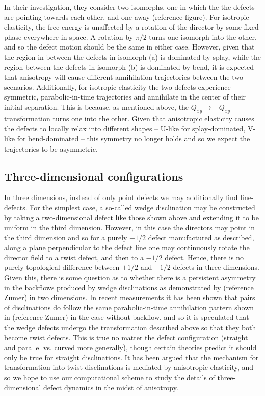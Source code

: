 \documentclass[reqno]{article}
\begin{document}
  In their investigation, they consider two isomorphs, one in which the the
  defects are pointing towards each other, and one away (reference figure).
  For isotropic elasticity, the free energy is unaffected by a rotation of the
  director by some fixed phase everywhere in space.
  A rotation by $\pi / 2$ turns one isomorph into the other, and so the defect
  motion should be the same in either case.
  However, given that the region in between the defects in isomorph (a) is dominated by splay,
  while the region between the defects in isomorph (b) is dominated by bend, it
  is expected that anisotropy will cause different annihilation trajectories
  between the two scenarios.
  Additionally, for isotropic elasticity the two defects experience symmetric,
  parabolic-in-time trajectories and annihilate in the center of their initial
  separation.
  This is because, as mentioned above, the $Q_{xy} \to -Q_{xy}$ transformation
  turns one into the other.
  Given that anisotropic elasticity causes the defects to locally relax into
  different shapes -- U-like for splay-dominated, V-like for bend-dominated --
  this symmetry no longer holds and so we expect the trajectories to be
  asymmetric.

  \subsection{Three-dimensional configurations}
  In three dimensions, instead of only point defects we may additionally
  find line-defects.
  For the simplest case, a so-called wedge disclination may be constructed by
  taking a two-dimensional
  defect like those shown above and extending it to be uniform in the third
  dimension.
  However, in this case the directors may point in the third dimension and so
  for a purely $+1/2$ defect manufactured as described, along a plane
  perpendicular to the defect line one may continuously rotate the director
  field to a twist defect, and then to a $-1/2$ defect.
  Hence, there is no purely topological difference between $+1/2$ and $-1/2$
  defects in three dimensions.
  Given this, there is some question as to whether there is a persistent
  asymmetry in the backflows produced by wedge disclinations as demonstrated by
  (reference Zumer) in two dimensions.
  In recent measurements it has been shown that pairs of disclinations do follow
  the same parabolic-in-time annihilation pattern shown in (reference Zumer) in
  the case without backflow, and so it is speculated that the wedge defects
  undergo the transformation described above so that they both become twist
  defects.
  This is true no matter the defect configuration (straight and parallel vs.
  curved more generally), though certain theories predict it should only be true
  for straight disclinations.
  It has been argued that the mechanism for transformation into twist
  disclinations is mediated by anisotropic elasticity, and so we hope to use our
  computational scheme to study the details of three-dimensional defect dynamics
  in the midst of anisotropy.
\end{document}
